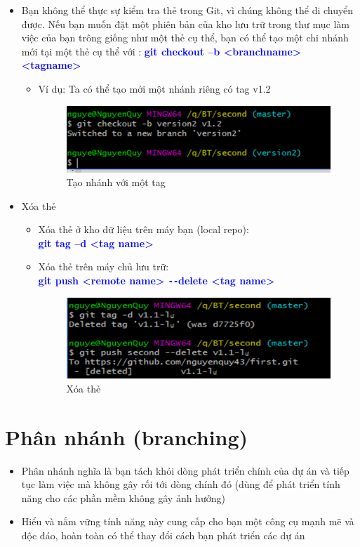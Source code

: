 \documentclass[12pt,a4paper]{report}
\begin{document}
\begin{itemize}
\begin{itemize}
\end{itemize}

\item Bạn không thể thực sự kiểm tra thẻ trong Git, vì chúng không thể di chuyển được. Nếu bạn muốn đặt một phiên bản của kho lưu trữ trong thư mục làm việc của bạn trông giống như một thẻ cụ thể, bạn có thể tạo một chi nhánh mới tại một thẻ cụ thể với : \textcolor{blue}{\bf git checkout –b <branchname> <tagname>}
\begin{itemize}
 \item Ví dụ: Ta có thể tạo mới một nhánh riêng có tag v1.2

\begin{figure}[!ht]
	\centering
	\includegraphics[width=0.8\linewidth]{screenshot046}
\caption{Tạo nhánh với một tag}
	\label{fig:screenshot046}
\end{figure}

\end{itemize}
\item Xóa thẻ
\begin{itemize}
\item Xóa thẻ ở kho dữ liệu trên máy bạn (local repo):\\ \textcolor{blue}{\bf  git tag –d <tag name>}
\item Xóa thẻ trên máy chủ lưu trữ:\\ \textcolor{blue}{\bf git push <remote name> \texttt{-{}-}delete <tag name>}

\begin{figure}[!ht]
	\centering
	\includegraphics[width=0.8\linewidth]{screenshot047}
	\caption{Xóa thẻ}
	\label{fig:screenshot047}
	\end{figure}
	
\end{itemize}\end{itemize}
			
\section{Phân nhánh (branching)}
\begin{itemize}
\item Phân nhánh nghĩa là bạn tách khỏi dòng phát triển chính của dự án và tiếp tục làm việc mà không gây rối tới dòng chính đó (dùng để phát triển tính năng cho các phần mềm không gây ảnh hưởng)\vskip 0.4cm
\item Hiểu và nắm vững tính năng này cung cấp cho bạn một công cụ mạnh mẽ và độc đáo, hoàn toàn có thể thay đổi cách bạn phát triển các dự án
\end{itemize}
\end{document}
